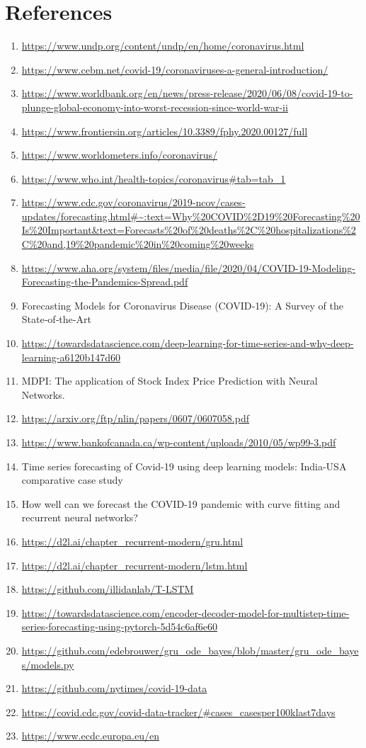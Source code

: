 \documentclass{article}
\begin{document}
\section{References}
\begin{enumerate} 
\item \url{https://www.undp.org/content/undp/en/home/coronavirus.html}
\item \url{https://www.cebm.net/covid-19/coronaviruses-a-general-introduction/}
\item \url{https://www.worldbank.org/en/news/press-release/2020/06/08/covid-19-to-plunge-global-economy-into-worst-recession-since-world-war-ii}
\item \url{https://www.frontiersin.org/articles/10.3389/fphy.2020.00127/full}
\item \url{https://www.worldometers.info/coronavirus/}
\item \url{https://www.who.int/health-topics/coronavirus#tab=tab_1}
\item \url{https://www.cdc.gov/coronavirus/2019-ncov/cases-updates/forecasting.html#~:text=Why%20COVID%2D19%20Forecasting%20Is%20Important&text=Forecasts%20of%20deaths%2C%20hospitalizations%2C%20and,19%20pandemic%20in%20coming%20weeks}
\item \url{https://www.aha.org/system/files/media/file/2020/04/COVID-19-Modeling-Forecasting-the-Pandemics-Spread.pdf}
\item Forecasting Models for Coronavirus Disease (COVID‑19): A Survey of the State‑of‑the‑Art
\item \url{https://towardsdatascience.com/deep-learning-for-time-series-and-why-deep-learning-a6120b147d60}
\item MDPI: The application of Stock Index Price Prediction with Neural Networks.
\item \url{https://arxiv.org/ftp/nlin/papers/0607/0607058.pdf}
\item \url{https://www.bankofcanada.ca/wp-content/uploads/2010/05/wp99-3.pdf}
\item Time series forecasting of Covid-19 using deep learning models: India-USA comparative case study
\item How well can we forecast the COVID-19 pandemic with curve fitting and recurrent neural networks?
\item \url{https://d2l.ai/chapter_recurrent-modern/gru.html}
\item \url{https://d2l.ai/chapter_recurrent-modern/lstm.html}
\item \url{https://github.com/illidanlab/T-LSTM}
\item \url{https://towardsdatascience.com/encoder-decoder-model-for-multistep-time-series-forecasting-using-pytorch-5d54c6af6e60}
\item \url{https://github.com/edebrouwer/gru_ode_bayes/blob/master/gru_ode_bayes/models.py}
\item \url{https://github.com/nytimes/covid-19-data}
\item \url{https://covid.cdc.gov/covid-data-tracker/#cases_casesper100klast7days}
\item \url{https://www.ecdc.europa.eu/en}
\end{enumerate} 
\end{document}
